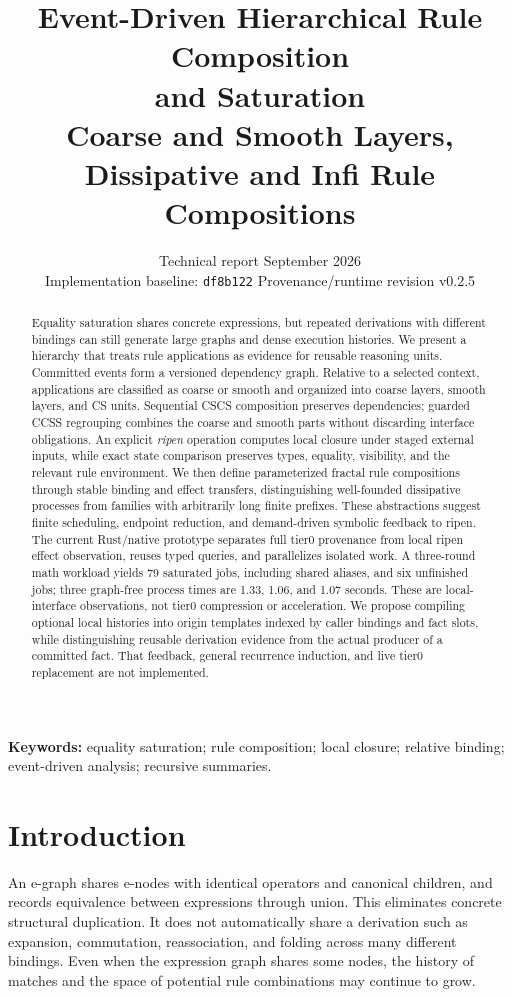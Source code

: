 \documentclass[11pt,a4paper]{article}
\title{Event-Driven Hierarchical Rule Composition\\and Saturation\\[5pt]
\large Coarse and Smooth Layers, Dissipative and Infi Rule Compositions}
\author{}
\date{Technical report \quad 23 September 2026\\
\small Implementation baseline: \texttt{df8b122} \quad Provenance/runtime revision v0.2.5}
\begin{document}
\maketitle
\begin{abstract}
Equality saturation shares concrete expressions, but repeated derivations with
different bindings can still generate large graphs and dense execution histories.
We present a hierarchy that treats rule applications as evidence for reusable
reasoning units. Committed events form a versioned dependency graph. Relative to
a selected context, applications are classified as coarse or smooth and organized
into coarse layers, smooth layers, and CS units. Sequential CSCS composition
preserves dependencies; guarded CCSS regrouping combines the coarse and smooth
parts without discarding interface obligations. An explicit \emph{ripen} operation
computes local closure under staged external inputs, while exact state comparison
preserves types, equality, visibility, and the relevant rule environment.
We then define parameterized fractal rule compositions through stable binding and effect
transfers, distinguishing well-founded dissipative processes from families with
arbitrarily long finite prefixes. These abstractions suggest finite scheduling,
endpoint reduction, and demand-driven symbolic feedback to ripen. The current Rust/native prototype separates full tier0 provenance from local
ripen effect observation, reuses typed queries, and parallelizes isolated work.
A three-round math workload yields 79 saturated jobs, including shared aliases,
and six unfinished jobs; three graph-free process times are 1.33, 1.06, and 1.07 seconds.
These are local-interface observations, not tier0 compression or acceleration.
We propose compiling optional local histories into origin templates indexed by
caller bindings and fact slots, while distinguishing reusable derivation evidence
from the actual producer of a committed fact. That feedback, general recurrence
induction, and live tier0 replacement are not implemented.
\end{abstract}
\noindent\textbf{Keywords:} equality saturation; rule composition; local closure;
relative binding; event-driven analysis; recursive summaries.

\section{Introduction}
An e-graph shares e-nodes with identical operators and canonical children, and
records equivalence between expressions through union. This eliminates concrete
structural duplication. It does not automatically share a derivation such as
expansion, commutation, reassociation, and folding across many different bindings.
Even when the expression graph shares some nodes, the history of matches and the
space of potential rule combinations may continue to grow.
\end{document}

